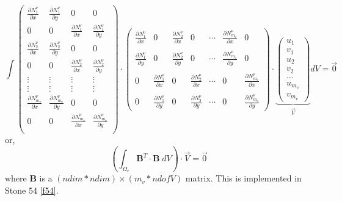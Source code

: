 \[
\int
\left(
\begin{array}{cccc}
\frac{\partial N_1^\upnu}{\partial x} & \frac{\partial N_1^\upnu}{\partial y} & 0 & 0 \\ 
0 & 0 & \frac{\partial N_1^\upnu}{\partial x} & \frac{\partial N_1^\upnu}{\partial y}  \\ 
\frac{\partial N_2^\upnu}{\partial x} & \frac{\partial N_2^\upnu}{\partial y} & 0 & 0 \\ 
0 & 0 & \frac{\partial N_2^\upnu}{\partial x} & \frac{\partial N_2^\upnu}{\partial y}  \\ 
\vdots & \vdots & \vdots & \vdots \\
\vdots & \vdots & \vdots & \vdots \\
\frac{\partial N_{m_\upnu}^\upnu}{\partial x} & \frac{\partial N_{m_\upnu}^\upnu}{\partial y } & 0 & 0 \\ 
0 & 0 & \frac{\partial N_{m_\upnu}^\upnu}{\partial x} & \frac{\partial N_{m_\upnu}^\upnu}{\partial y}  \\ 
\end{array}
\right)
\cdot
\left(
\begin{array}{cccccccccc}
\frac{\partial N_1^\upnu}{\partial x} & 0  & \frac{\partial N_2^\upnu}{\partial x} & 0  & \cdots & \frac{\partial N^\upnu_{m_\upnu}}{\partial x} & 0 \\ \\
\frac{\partial N_1^\upnu}{\partial y} & 0  & \frac{\partial N_2^\upnu}{\partial y} & 0  & \cdots & \frac{\partial N^\upnu_{m_\upnu}}{\partial y} & 0 \\ \\
0 & \frac{\partial N_1^\upnu}{\partial x}  & 0& \frac{\partial N_2^\upnu}{\partial x}  & \cdots & 0 & \frac{\partial N^\upnu_{m_\upnu}}{\partial x}  \\ \\
0 & \frac{\partial N_1^\upnu}{\partial y}  & 0& \frac{\partial N_2^\upnu}{\partial y}  & \cdots & 0 & \frac{\partial N^\upnu_{m_\upnu}}{\partial y}  
\end{array}
\right) 
\cdot
\underbrace{
\left(
\begin{array}{c}
u_1 \\ v_1 \\ u_2 \\ v_2 \\ \dots \\ u_{m_v} \\ v_{m_v} 
\end{array}
\right) }_{\vec V}
dV
=\vec{0}
\]
or, 
\[
\left( \int_{\Omega_e} {\bm B}^T  \cdot {\bm B} \; dV \right)\cdot \vec{V} = \vec{0}
\]
where ${\bm B}$ is a $(ndim*ndim) \times (m_v*ndofV)$ matrix. This is implemented in Stone 54 \ref{f54}.

